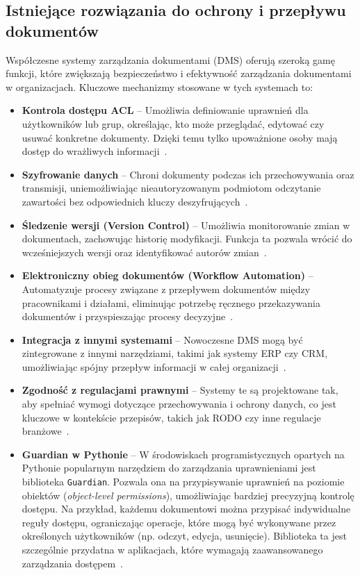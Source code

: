 \subsection{Istniejące rozwiązania do ochrony i przepływu dokumentów}

Współczesne systemy zarządzania dokumentami (DMS) oferują szeroką gamę funkcji, które zwiększają bezpieczeństwo i efektywność zarządzania dokumentami w organizacjach. Kluczowe mechanizmy stosowane w tych systemach to:

\begin{itemize}
	\item \textbf{Kontrola dostępu ACL} -- Umożliwia definiowanie uprawnień dla użytkowników lub grup, określając, kto może przeglądać, edytować czy usuwać konkretne dokumenty. Dzięki temu tylko upoważnione osoby mają dostęp do wrażliwych informacji~\cite{acl, acl_2}.
	
	\item \textbf{Szyfrowanie danych} -- Chroni dokumenty podczas ich przechowywania oraz transmisji, uniemożliwiając nieautoryzowanym podmiotom odczytanie zawartości bez odpowiednich kluczy deszyfrujących~\cite{szyrowanie_danych}.

	\item \textbf{Śledzenie wersji (Version Control)} -- Umożliwia monitorowanie zmian w dokumentach, zachowując historię modyfikacji. Funkcja ta pozwala wrócić do wcześniejszych wersji oraz identyfikować autorów zmian~\cite{kontrola_wersji}. 
	
	\item \textbf{Elektroniczny obieg dokumentów (Workflow Automation)} -- Automatyzuje procesy związane z przepływem dokumentów między pracownikami i działami, eliminując potrzebę ręcznego przekazywania dokumentów i przyspieszając procesy decyzyjne~\cite{workflow_automation}.

	\item \textbf{Integracja z innymi systemami} -- Nowoczesne DMS mogą być zintegrowane z innymi narzędziami, takimi jak systemy ERP czy CRM, umożliwiając spójny przepływ informacji w całej organizacji~\cite{dms}. 

	\item \textbf{Zgodność z regulacjami prawnymi} -- Systemy te są projektowane tak, aby spełniać wymogi dotyczące przechowywania i ochrony danych, co jest kluczowe w kontekście przepisów, takich jak RODO czy inne regulacje branżowe~\cite{rodo_dokumenty}.
	
	\item \textbf{Guardian w Pythonie} -- W środowiskach programistycznych opartych na Pythonie popularnym narzędziem do zarządzania uprawnieniami jest biblioteka \texttt{Guardian}. Pozwala ona na przypisywanie uprawnień na poziomie obiektów (\emph{object-level permissions}), umożliwiając bardziej precyzyjną kontrolę dostępu. Na przykład, każdemu dokumentowi można przypisać indywidualne reguły dostępu, ograniczając operacje, które mogą być wykonywane przez określonych użytkowników (np. odczyt, edycja, usunięcie). Biblioteka ta jest szczególnie przydatna w aplikacjach, które wymagają zaawansowanego zarządzania dostępem~\cite{django_guardian}.
\end{itemize}

